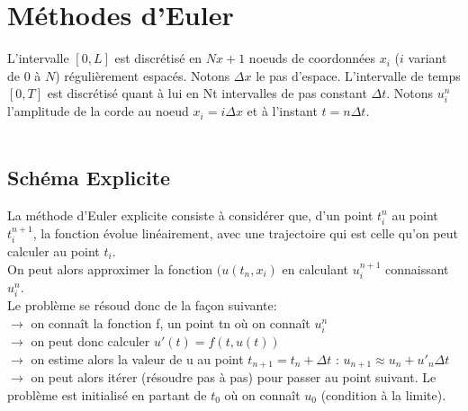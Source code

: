 \section{Méthodes d'Euler}

L'intervalle $[0,L]$ est discrétisé en $Nx+1$ noeuds de coordonnées $x_{i}$ ($i$ variant de $0$ à $N$) régulièrement espacés. Notons $\Delta x$ le pas d'espace. L'intervalle de temps $[0,T]$ est discrétisé quant à lui en Nt intervalles de pas constant $\Delta t$. Notons $u^{n}_{i}$ l'amplitude de la corde au noeud $x_{i} = i\Delta x$ et à l'instant $t = n\Delta t$.\\\\

\subsection{Schéma Explicite}

La méthode d'Euler explicite consiste à considérer que, d'un point $t^n_{i}$ au point $t^{n+1}_{i}$, la fonction évolue linéairement, avec une trajectoire qui est celle qu'on peut calculer au point $t_i$.\\
On peut alors approximer la fonction $(u(t_n,x_i)$ en  calculant $u^{n+1}_{i}$ connaissant $u^n_{i}$.\\


Le problème se résoud donc de la façon suivante:\\
$\rightarrow$ on connaît la fonction f, un point tn où on connaît $u^n_{i}$\\
$\rightarrow$ on peut donc calculer $u'(t)=f(t,u(t))$ \\
$\rightarrow$ on estime alors la valeur de u au point $t_{n+1} = t_n + \Delta t$ : $u_{n+1} \approx u_n + u'_n\Delta t$\\
$\rightarrow$ on peut alors itérer (résoudre pas à pas) pour passer au point suivant. Le problème est initialisé en partant de $t_0$ où on connaît $u_0$ (condition à la limite).\\


